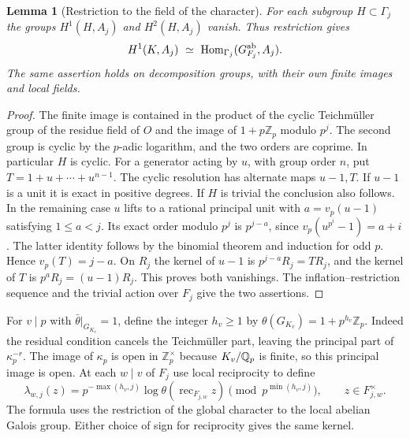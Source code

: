 \documentclass[a4paper,11pt]{article}
\newtheorem{lemma}[proposition]{Lemma}
\theoremstyle{definition}
\theoremstyle{remark}
\newcommand{\ZZ}{\mathbb Z}\newcommand{\ord}{\operatorname{ord}}
\numberwithin{equation}{section}
\begin{document}
\begin{lemma}[Restriction to the field of the character]\label{lem:cyclic113}
For each subgroup \(H\subset\Gamma_j\) the groups
\(H^1(H,A_j)\) and \(H^2(H,A_j)\) vanish. Thus restriction gives
\[
 H^1(K,A_j)\ \simeq\
   \operatorname{Hom}_{\Gamma_j}(G_{F_j}^{\rm ab},A_j).
\]
The same assertion holds on decomposition groups, with their own
finite images and local fields.
\end{lemma}
\begin{proof}
The finite image is contained in the product of the cyclic
Teichm\"uller group of the residue field of \(O\) and the image of
\(1+p\ZZ_p\) modulo \(p^j\). The second group is cyclic by the
\(p\)-adic logarithm, and the two orders are coprime. In particular
\(H\) is cyclic. For a generator acting by \(u\), with group order
\(n\), put \(T=1+u+\cdots+u^{n-1}\). The cyclic resolution has
alternate maps \(u-1,T\). If \(u-1\) is a unit it is exact in
positive degrees. If \(H\) is trivial the conclusion also follows.
In the remaining case \(u\) lifts to a rational principal unit with
\(a=v_p(u-1)\) satisfying \(1\le a<j\). Its exact order modulo
\(p^j\) is \(p^{j-a}\), since
\(v_p(u^{p^i}-1)=a+i\). The latter identity follows by the binomial
theorem and induction for odd \(p\). Hence \(v_p(T)=j-a\).
On \(R_j\) the kernel of \(u-1\) is \(p^{j-a}R_j=TR_j\), and
the kernel of \(T\) is \(p^aR_j=(u-1)R_j\).
This proves both vanishings. The inflation--restriction sequence
and the trivial action over \(F_j\) give the two assertions.
\end{proof}

For \(v\mid p\) with \(\bar\theta|_{G_{K_v}}=1\), define the
integer \(h_v\ge1\) by
\(\theta(G_{K_v})=1+p^{h_v}\ZZ_p\). Indeed the residual condition
cancels the Teichm\"uller part, leaving the principal part of
\(\kappa_p^{-r}\). The image of \(\kappa_p\) is open in
\(\ZZ_p^\times\) because \(K_v/\mathbb Q_p\) is finite, so this principal
image is open. At each \(w\mid v\) of \(F_j\) use local reciprocity
to define
\begin{equation}
 \lambda_{w,j}(z)=
     p^{-\max(h_v,j)}\log\theta(\operatorname{rec}_{F_{j,w}}z)
            \pmod {p^{\min(h_v,j)}},\qquad z\in F_{j,w}^\times .
 \label{eq:log113}
\end{equation}
The formula uses the restriction of the global character to the
local abelian Galois group. Either choice of sign for reciprocity
gives the same kernel.
\end{document}
